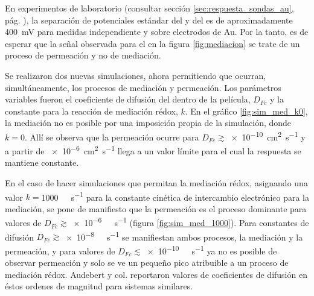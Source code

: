 		En experimentos de laboratorio (consultar sección \ref{sec:respuesta_sondas_au}, pág. \pageref{sec:respuesta_sondas_au}), la separación de potenciales estándar del \ru\space y del \fc\space es de aproximadamente \SI{400}{\milli\volt} para medidas independiente y sobre electrodos de Au. Por la tanto, es de esperar que la señal observada para el \fc\space en la figura \ref{fig:mediacion} se trate de un proceso de permeación y no de mediación.

		Se realizaron dos nuevas simulaciones, ahora permitiendo que ocurran, simultáneamente, los procesos de mediación y permeación. Los parámetros variables fueron el coeficiente de difusión del \fc\space dentro de la película, $D_{Fc}$ y la constante para la reacción de mediación rédox, $k$. En el gráfico \ref{fig:sim_med_k0}, la mediación no es posible por una imposición propia de la simulación, donde $k\!=\!0$. Allí se observa que la permeación ocurre para $D_{Fc}\!\!\gtrsim$\SI{e-10}{\square\cm\per\second} y a partir de \SI{e-6}{\square\cm\per\second} llega a un valor límite para el cual la respuesta se mantiene constante.

		En el caso de hacer simulaciones que permitan la mediación rédox, asignando una valor $k\!=$\SI{1000}{\per\Molar\per\second} para la constante cinética de intercambio electrónico para la mediación, se pone de manifiesto que la permeación es el proceso dominante para valores de $D_{Fc}\!\gtrsim$\SI{e-6}{\per\Molar\per\second} (figura \ref{fig:sim_med_1000}). Para constantes de difusión $D_{Fc}\!\gtrsim$\SI{e-8}{\per\Molar\per\second} se manifiestan ambos procesos, la mediación y la permeación, y para valores de $D_{Fc}\!\lesssim$\SI{e-10}{\per\Molar\per\second} ya no es posible de observar permeación y solo se ve un pequeño pico atribuible a un proceso de mediación rédox. Audebert y col. reportaron valores de coeficientes de difusión en éstos ordenes de magnitud para sistemas similares\cite{Audebert2015}. 

